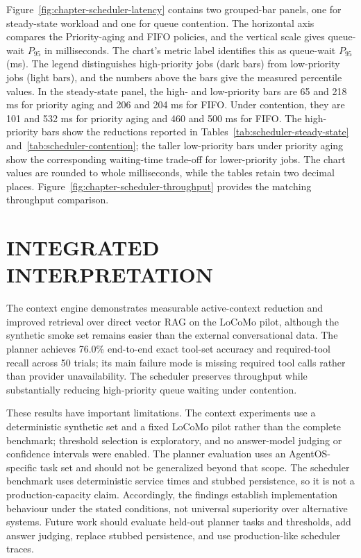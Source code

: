 Figure~\ref{fig:chapter-scheduler-latency} contains two grouped-bar panels, one for steady-state workload and one for queue contention. The horizontal axis compares the Priority-aging and FIFO policies, and the vertical scale gives queue-wait $P_{95}$ in milliseconds. The chart's metric label identifies this as queue-wait $P_{95}$ (ms). The legend distinguishes high-priority jobs (dark bars) from low-priority jobs (light bars), and the numbers above the bars give the measured percentile values. In the steady-state panel, the high- and low-priority bars are 65 and 218 ms for priority aging and 206 and 204 ms for FIFO. Under contention, they are 101 and 532 ms for priority aging and 460 and 500 ms for FIFO. The high-priority bars show the reductions reported in Tables~\ref{tab:scheduler-steady-state} and~\ref{tab:scheduler-contention}; the taller low-priority bars under priority aging show the corresponding waiting-time trade-off for lower-priority jobs. The chart values are rounded to whole milliseconds, while the tables retain two decimal places. Figure~\ref{fig:chapter-scheduler-throughput} provides the matching throughput comparison.

\section{\uppercase{Integrated interpretation}}

The context engine demonstrates measurable active-context reduction and improved retrieval over direct vector RAG on the LoCoMo pilot, although the synthetic smoke set remains easier than the external conversational data. The planner achieves 76.0\% end-to-end exact tool-set accuracy and required-tool recall across 50 trials; its main failure mode is missing required tool calls rather than provider unavailability. The scheduler preserves throughput while substantially reducing high-priority queue waiting under contention.

These results have important limitations. The context experiments use a deterministic synthetic set and a fixed LoCoMo pilot rather than the complete benchmark; threshold selection is exploratory, and no answer-model judging or confidence intervals were enabled. The planner evaluation uses an AgentOS-specific task set and should not be generalized beyond that scope. The scheduler benchmark uses deterministic service times and stubbed persistence, so it is not a production-capacity claim. Accordingly, the findings establish implementation behaviour under the stated conditions, not universal superiority over alternative systems. Future work should evaluate held-out planner tasks and thresholds, add answer judging, replace stubbed persistence, and use production-like scheduler traces.

